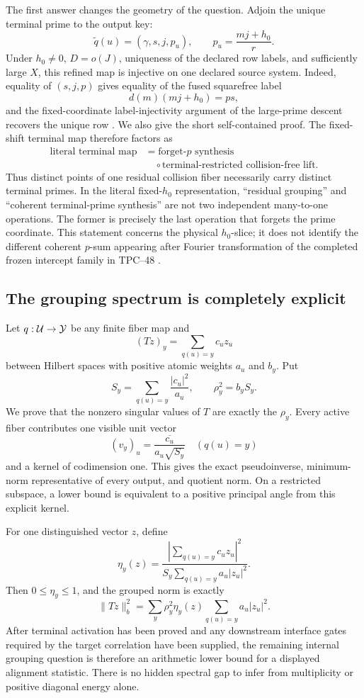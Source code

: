The first answer changes the geometry of the question.  Adjoin the unique
terminal prime to the output key:
\[
 \widetilde q(u)=(\gamma,s,j,p_u),
 \qquad p_u=\frac{mj+h_0}{r}.
\]
Under \(h_0\ne0\), \(D=o(J)\), uniqueness of the declared row labels,
and sufficiently large \(X\), this refined map is injective on one
declared source system.  Indeed,
equality of \((s,j,p)\) gives equality of the fused squarefree label
\[
 d(m)(mj+h_0)=p s,
\]
and the fixed-coordinate label-injectivity argument of the large-prime
descent recovers the unique row \citep{WangTPC45}.  We also give the short
self-contained proof.  The fixed-shift terminal map therefore factors as
\[
 \boxed{\begin{aligned}
 \text{literal terminal map}
 &=\text{forget-}p\text{ synthesis}\\
 &\quad\circ\text{terminal-restricted collision-free lift}.
 \end{aligned}}
\]
Thus distinct points of one residual collision fiber necessarily carry
distinct terminal primes.  In the literal fixed-\(h_0\) representation,
``residual grouping'' and ``coherent terminal-prime synthesis'' are not two
independent many-to-one operations.  The former is precisely the last
operation that forgets the prime coordinate.  This statement concerns the
physical \(h_0\)-slice; it does not identify the different coherent
\(p\)-sum appearing after Fourier transformation of the completed frozen
intercept family in TPC--48 \citep{WangTPC48}.

\subsection{The grouping spectrum is completely explicit}

Let \(q:\mathcal U\to\mathcal Y\) be any finite fiber map and
\[
 (Tz)_y=\sum_{q(u)=y}c_uz_u
\]
between Hilbert spaces with positive atomic weights \(a_u\) and \(b_y\).
Put
\[
 S_y=\sum_{q(u)=y}\frac{|c_u|^2}{a_u},
 \qquad \rho_y^2=b_yS_y.
\]
We prove that the nonzero singular values of \(T\) are exactly the
\(\rho_y\).  Every active fiber contributes one visible unit vector
\[
 (v_y)_u=\frac{\overline{c_u}}{a_u\sqrt{S_y}}
 \quad(q(u)=y)
\]
and a kernel of codimension one.  This gives the exact pseudoinverse,
minimum-norm representative of every output, and quotient norm.  On a
restricted subspace, a lower bound is equivalent to a positive principal
angle from this explicit kernel.

For one distinguished vector \(z\), define
\[
 \eta_y(z)=
 \frac{\left|\sum_{q(u)=y}c_uz_u\right|^2}
 {S_y\sum_{q(u)=y}a_u|z_u|^2}.
\]
Then \(0\le\eta_y\le1\), and the grouped norm is exactly
\[
 \|Tz\|_b^2
 =\sum_y\rho_y^2\eta_y(z)
       \sum_{q(u)=y}a_u|z_u|^2.
\]
After terminal activation has been proved and any downstream interface
gates required by the target correlation have been supplied, the remaining
internal grouping question is therefore an arithmetic lower bound for a
displayed alignment statistic.  There is no hidden spectral gap to infer
from multiplicity or positive diagonal energy alone.

